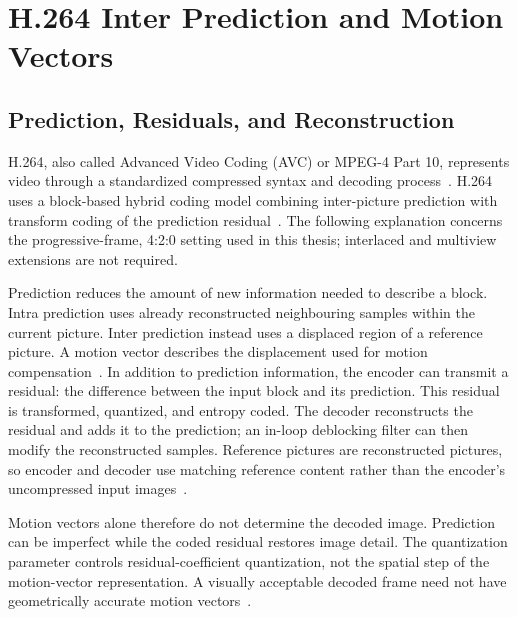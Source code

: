 \section{H.264 Inter Prediction and Motion Vectors}

\subsection{Prediction, Residuals, and Reconstruction}

H.264, also called Advanced Video Coding (AVC) or MPEG-4 Part 10, represents
video through a standardized compressed syntax and decoding
process~\cite{Wiegand2003Overview,ITUT_H264_2026}. H.264 uses a block-based
hybrid coding model combining inter-picture prediction with transform coding
of the prediction residual~\cite[Sec.~IV]{Wiegand2003Overview}.
The following explanation concerns the progressive-frame, 4:2:0 setting used
in this thesis; interlaced and multiview extensions are not required.

Prediction reduces the amount of new information needed to describe a block.
Intra prediction uses already reconstructed neighbouring samples within the
current picture. Inter prediction instead uses a displaced region of a
reference picture. A motion vector describes the displacement used for motion
compensation~\cite[Sec.~3.95]{ITUT_H264_2026}. In addition to prediction information,
the encoder can transmit a residual: the difference between the input block and
its prediction. This residual is transformed, quantized, and entropy coded.
The decoder reconstructs the residual and adds it to the prediction; an in-loop
deblocking filter can then modify the reconstructed samples. Reference pictures
are reconstructed pictures, so encoder and decoder use matching reference
content rather than the encoder's uncompressed input
images~\cite[Sec.~IV]{Wiegand2003Overview}.

Motion vectors alone therefore do not determine the decoded image. Prediction
can be imperfect while the coded residual restores image detail. The
quantization parameter controls residual-coefficient quantization, not the
spatial step of the motion-vector representation. A visually acceptable decoded
frame need not have geometrically accurate motion
vectors~\cite{Wiegand2003Overview,young2020fast}.

